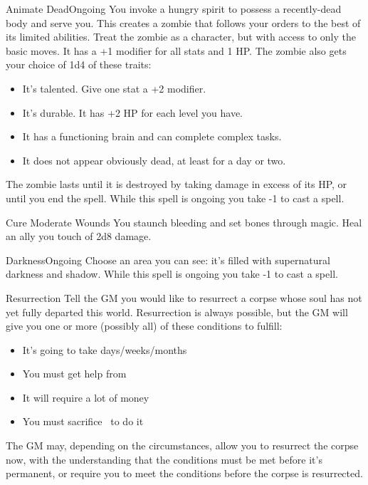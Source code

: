 \documentclass[8pt]{extarticle}
\begin{document}
\begin{multicols}{2}
  \begin{aspell}{Animate Dead}{Ongoing}
    You invoke a hungry spirit to possess a recently-dead body and
    serve you. This creates a zombie that follows your orders to the
    best of its limited abilities. Treat the zombie as a character,
    but with access to only the basic moves. It has a +1 modifier for
    all stats and 1 HP. The zombie also gets your choice of 1d4 of
    these traits:
    \begin{itemize}
    \item It’s talented. Give one stat a +2 modifier.
    \item It’s durable. It has +2 HP for each level you have.
    \item It has a functioning brain and can complete complex tasks.
    \item It does not appear obviously dead, at least for a day or
      two.
    \end{itemize}
    The zombie lasts until it is destroyed by taking damage in excess
    of its HP, or until you end the spell. While this spell is ongoing
    you take -1 to cast a spell.
  \end{aspell}

  \begin{aspell}{Cure Moderate Wounds}{}
    You staunch bleeding and set bones through magic. Heal an ally you
    touch of 2d8 damage.
  \end{aspell}

  \begin{aspell}{Darkness}{Ongoing}
    Choose an area you can see: it’s filled with supernatural darkness
    and shadow.  While this spell is ongoing you take -1 to cast a
    spell.
  \end{aspell}
  \vfill\null
  \columnbreak

  \begin{aspell}{Resurrection}{}
    Tell the GM you would like to resurrect a corpse whose soul has
    not yet fully departed this world. Resurrection is always
    possible, but the GM will give you one or more (possibly all) of
    these conditions to fulfill:
    \begin{itemize}
    \item It’s going to take days/weeks/months
    \item You must get help from \blank
    \item It will require a lot of money
    \item You must sacrifice \blank\ to do it
    \end{itemize}
    The GM may, depending on the circumstances, allow you to resurrect
    the corpse now, with the understanding that the conditions must be
    met before it’s permanent, or require you to meet the conditions
    before the corpse is resurrected.
  \end{aspell}


\end{multicols}
\end{document}
